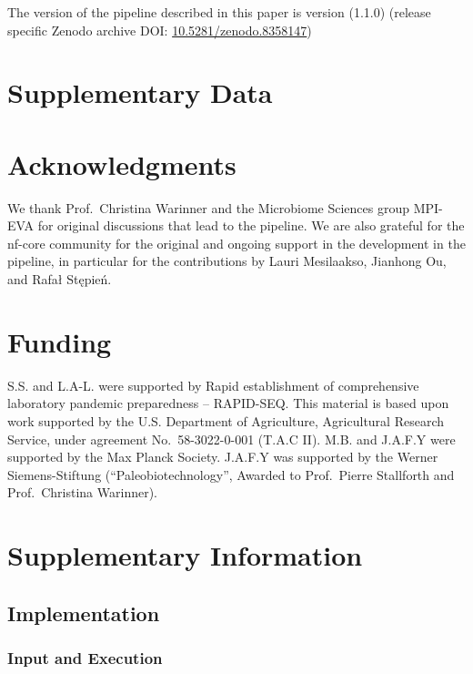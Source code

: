\documentclass[
]{article}
\begin{document}
The version of the pipeline described in this paper is version (1.1.0)
(release specific Zenodo archive DOI:
\href{https://doi.org/10.5281/zenodo.8358147}{10.5281/zenodo.8358147})

\hypertarget{supplementary-data}{%
\section{Supplementary Data}\label{supplementary-data}}

\hypertarget{acknowledgments}{%
\section{Acknowledgments}\label{acknowledgments}}

We thank Prof.~Christina Warinner and the Microbiome Sciences group
MPI-EVA for original discussions that lead to the pipeline. We are also
grateful for the nf-core community for the original and ongoing support
in the development in the pipeline, in particular for the contributions
by Lauri Mesilaakso, Jianhong Ou, and Rafał Stępień.

\hypertarget{funding}{%
\section{Funding}\label{funding}}

S.S. and L.A-L. were supported by Rapid establishment of comprehensive
laboratory pandemic preparedness -- RAPID-SEQ. This material is based
upon work supported by the U.S. Department of Agriculture, Agricultural
Research Service, under agreement No.~58-3022-0-001 (T.A.C II). M.B. and
J.A.F.Y were supported by the Max Planck Society. J.A.F.Y was supported
by the Werner Siemens-Stiftung (``Paleobiotechnology'', Awarded to
Prof.~Pierre Stallforth and Prof.~Christina Warinner).

\hypertarget{supplementary-information}{%
\section{Supplementary Information}\label{supplementary-information}}

\hypertarget{implementation}{%
\subsection{Implementation}\label{implementation}}

\hypertarget{input-and-execution}{%
\subsubsection{Input and Execution}\label{input-and-execution}}
\end{document}
